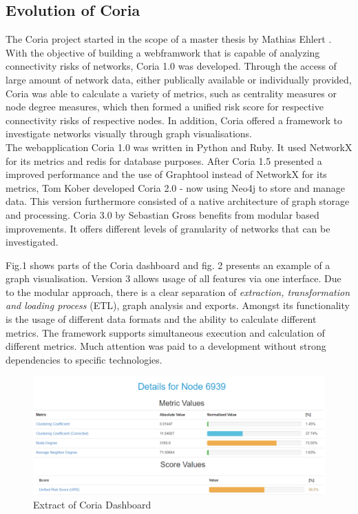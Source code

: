 \documentclass[conference, 11pt]{IEEEtran}
\begin{document}
\subsection{Evolution of Coria}
The Coria project started in the scope of a master thesis by Mathias Ehlert \cite{Ehlert}. With the objective of building a webframwork that is capable of analyzing connectivity risks of networks, Coria 1.0 was developed. Through the access of large amount of network data, either publically available or individually provided, Coria was able to calculate a variety of metrics, such as  
centrality measures or node degree measures, which then formed a unified risk score for respective connectivity risks of respective nodes. In addition, Coria offered a framework to investigate networks visually through graph visualisations. \\ \linebreak 
 The webapplication Coria 1.0 was written in Python and Ruby. It used NetworkX for its metrics and redis for database purposes. After Coria 1.5 presented a improved performance and the use of Graphtool instead of NetworkX for its metrics, Tom Kober developed Coria 2.0 - now using Neo4j to store and manage data. This version furthermore consisted of a native architecture of graph storage and processing\cite{Coria2}. Coria 3.0 by Sebastian Gross benefits from modular based improvements. It offers different levels of granularity of networks that can be investigated. \linebreak

Fig.1 shows parts of the Coria dashboard and fig. 2 presents an example of a graph visualisation. Version 3 allows usage of all features via one interface. Due to the modular approach, there is a clear separation of \textit{extraction, transformation and loading process} (ETL), graph analysis and exports. Amongst its functionality is the usage of different data formats and the ability to calculate different metrics. The framework supports simultaneous execution and calculation of different metrics. Much attention was paid to a development without strong dependencies to specific technologies\cite{Coria3}. \\ \linebreak
 
 \begin{figure}[htbp]
\centerline{\includegraphics[scale=0.39]{Graphics/CoriaExtract.PNG}}
\caption{Extract of Coria Dashboard}
\label{fig}
\end{figure} 
\end{document}
